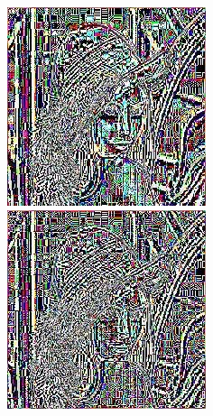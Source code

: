 \documentclass[a4paper,12pt]{article}
\begin{document}
\begin{figure}[h]
    \centering
\begin{minipage}[h]{.45\linewidth}
\centering
\includegraphics[width=0.55\linewidth]{preconditioning/lena_av3}
\end{minipage}
\hfill
\begin{minipage}[h]{0.45\linewidth}
\centering
\includegraphics[width=0.55\linewidth]{preconditioning/lena_av4}
\end{minipage}
\end{figure}
\end{document}
